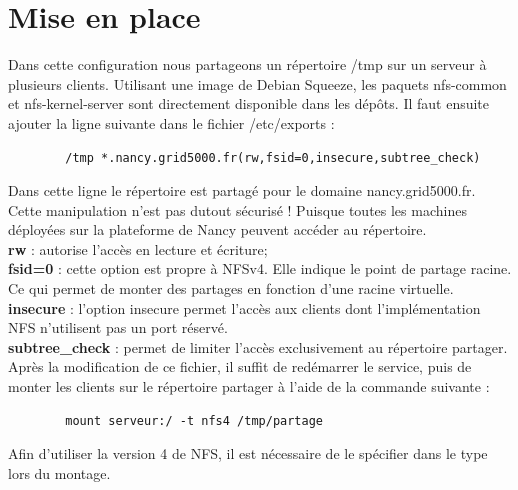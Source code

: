 \documentclass[12pt]{report}
\begin{document}
    \section{Mise en place}
    
    Dans cette configuration nous partageons un répertoire /tmp sur un serveur à plusieurs clients. Utilisant une image de Debian Squeeze,
    les paquets nfs-common et nfs-kernel-server sont directement disponible dans les dépôts. Il faut ensuite ajouter la ligne suivante dans
    le fichier /etc/exports :
    \begin{lstlisting}
	    /tmp *.nancy.grid5000.fr(rw,fsid=0,insecure,subtree_check)
	  \end{lstlisting}
	  Dans cette ligne le répertoire est partagé pour le domaine nancy.grid5000.fr. Cette manipulation n'est pas dutout sécurisé ! Puisque toutes
	  les machines déployées sur la plateforme de Nancy peuvent accéder au répertoire.\\
	  \textbf{rw }: autorise l'accès en lecture et écriture;\\
	  \textbf{fsid=0} : cette option est propre à NFSv4. Elle indique le point de partage racine. Ce qui permet de monter des partages en fonction d'une  
	  racine virtuelle.\\
	  \textbf{insecure} : l'option insecure permet l'accès aux clients dont l'implémentation NFS n'utilisent pas un port réservé.\\
	  \textbf{subtree\_check} : permet de limiter l'accès exclusivement au répertoire partager.\\
	  
	  Après la modification de ce fichier, il suffit de redémarrer le service, puis de monter les clients sur le répertoire partager à l'aide de la 
	  commande suivante :\\
	  \begin{lstlisting}
	    mount serveur:/ -t nfs4 /tmp/partage
	  \end{lstlisting}
	  Afin d'utiliser la version 4 de NFS, il est nécessaire de le spécifier dans le type lors du montage.\\
\end{document}
